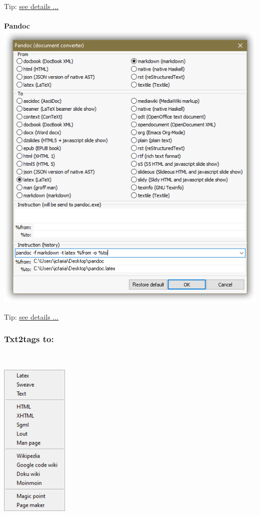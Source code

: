 Tip: \href{http://deplate.sourceforge.net/Output.html}{see details ...}


\newpage
\hypertarget{menu_tools_processing_conversion_pandoc}{}
\paragraph{}\textbf{Pandoc}\\

\includegraphics[scale=.50]{./res/pandoc.png}

Tip: \href{http://johnmacfarlane.net/pandoc/index.html}{see details ...}


\newpage
\hypertarget{menu_tools_processing_conversion_txt2tags}{}
\subsubsection{Txt2tags to:}\\

\includegraphics[scale=0.50]{./res/menu_tools_processing_conversion_txt2tags.png}\\


